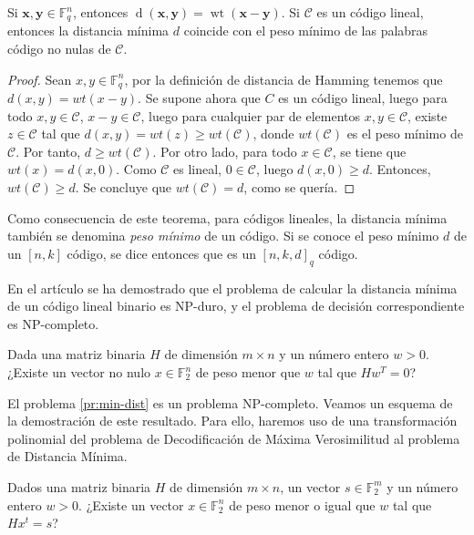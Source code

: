 \begin{theorem}
    Si $\mathbf{x}, \mathbf{y} \in \mathbb{F}_q^n$, entonces $\operatorname{d}(\mathbf{x},\mathbf{y}) = \operatorname{wt}(\mathbf{x}-\mathbf{y})$. Si $\mathcal{C}$ es un código lineal, entonces la distancia mínima $d$ coincide con el peso mínimo de las palabras código no nulas de $\mathcal{C}$.
\end{theorem}

\begin{proof}
    Sean $x,y \in \mathbb{F}_q^n$, por la definición de distancia de Hamming tenemos que $d(x,y) = wt(x-y)$. Se supone ahora que $C$ es un código lineal, luego para todo $x,y \in \mathcal{C}$, $x-y \in \mathcal{C}$, luego para cualquier par de elementos $x,y \in \mathcal{C}$, existe $z \in \mathcal{C}$ tal que $d(x,y) = wt(z) \geq wt(\mathcal{C})$, donde $wt(\mathcal{C})$ es el peso mínimo de $\mathcal{C}$. Por tanto, $d \geq wt(\mathcal{C})$. Por otro lado, para todo $x \in \mathcal{C}$, se tiene que $wt(x) = d(x,0)$. Como $\mathcal{C}$ es lineal, $0 \in \mathcal{C}$, luego $d(x,0) \geq d$. Entonces, $wt(\mathcal{C}) \geq d$. Se concluye que $wt(\mathcal{C}) = d$, como se quería.
\end{proof}

Como consecuencia de este teorema, para códigos lineales, la distancia mínima también se denomina \emph{peso mínimo} de un código. Si se conoce el peso mínimo $d$ de un $[n,k]$ código, se dice entonces que es un $[n,k,d]_q$ código.

En el artículo \cite{Vardy_1997} se ha demostrado que el problema de calcular la distancia mínima de un código lineal binario es NP-duro, y el problema de decisión correspondiente es NP-completo.

\begin{problemth}
    \label{pr:min-dist}
    Dada una matriz binaria $H$ de dimensión $m \times n$ y un número entero $w > 0$. ¿Existe un vector no nulo $x \in \mathbb{F}_2^n$ de peso menor que $w$ tal que $Hw^T = 0$? 
\end{problemth}

El problema \ref{pr:min-dist} es un problema NP-completo. Veamos un esquema de la demostración de este resultado. Para ello, haremos uso de una transformación polinomial del problema de Decodificación de Máxima Verosimilitud al problema de Distancia Mínima.

\begin{problemth}
    \label{pr:dmv}
    Dados una matriz binaria $H$ de dimensión $m \times n$, un vector $s \in \mathbb{F}_2^m$ y un número entero $w > 0$. ¿Existe un vector $x \in \mathbb{F}_2^n$ de peso menor o igual que $w$ tal que $Hx^t = s$?
\end{problemth}

